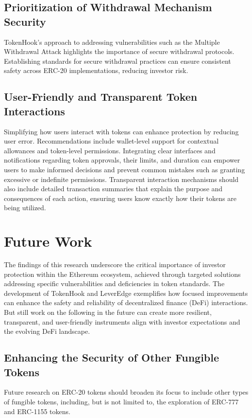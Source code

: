 \subsection{Prioritization of Withdrawal Mechanism Security}
TokenHook's approach to addressing vulnerabilities such as the Multiple Withdrawal Attack highlights the importance of secure withdrawal protocols. Establishing standards for secure withdrawal practices can ensure consistent safety across ERC-20 implementations, reducing investor risk.

\subsection{User-Friendly and Transparent Token Interactions}
Simplifying how users interact with tokens can enhance protection by reducing user error. Recommendations include wallet-level support for contextual allowances and token-level permissions. Integrating clear interfaces and notifications regarding token approvals, their limits, and duration can empower users to make informed decisions and prevent common mistakes such as granting excessive or indefinite permissions. Transparent interaction mechanisms should also include detailed transaction summaries that explain the purpose and consequences of each action, ensuring users know exactly how their tokens are being utilized. 

\section{Future Work}
The findings of this research underscore the critical importance of investor protection within the Ethereum ecosystem, achieved through targeted solutions addressing specific vulnerabilities and deficiencies in token standards. The development of TokenHook and LeverEdge exemplifies how focused improvements can enhance the safety and reliability of decentralized finance (DeFi) interactions. But still work on the following in the future can create more resilient, transparent, and user-friendly instruments align with investor expectations and the evolving DeFi landscape.

\subsection{Enhancing the Security of Other Fungible Tokens}
Future research on ERC-20 tokens should broaden its focus to include other types of fungible tokens, including, but is not limited to, the exploration of ERC-777 and ERC-1155 tokens.

